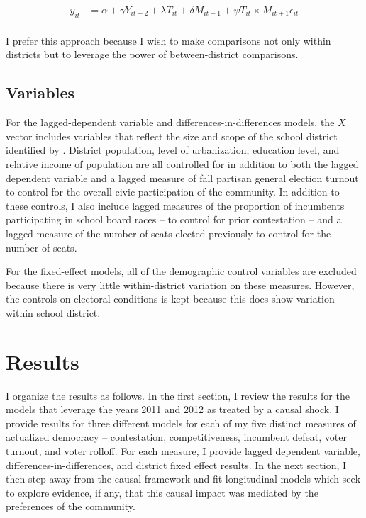 \begin{align*} 
y_{it} &= \alpha + \gamma Y_{it-2} + \lambda T_{it} + \delta M_{it+1} + \psi T_{it} \times M_{it+1} \epsilon_{it}  \\ 
\end{align*}

I prefer this approach because I wish to make comparisons not only within districts 
but to leverage the power of between-district comparisons. 

\subsection{Variables}

For the lagged-dependent variable and differences-in-differences models, the 
$X$ vector includes variables that reflect the size and scope of the school 
district identified by \citet{RefWorks:297}. District population, level of 
urbanization, 
education level, and relative income of population are all controlled for 
in addition to both the lagged dependent variable and a lagged measure of 
fall partisan general election turnout to control for the overall civic 
participation of the community. In addition to these controls, I also include 
lagged measures of the proportion of incumbents participating in school board 
races -- to control for prior contestation -- and a lagged measure of the number 
of seats elected previously to control for the number of seats. 

For the fixed-effect models, all of the demographic control variables are 
excluded because there is very little within-district variation on these measures. 
However, the controls on electoral conditions is kept because this does show 
variation within school district. 

\section{Results}

I organize the results as follows. In the first section, I review the results 
for the models that leverage the years 2011 and 2012 as treated by a causal 
shock. I provide results for three different models for each of my five distinct
measures of actualized democracy -- contestation, competitiveness, incumbent defeat,
voter turnout, and voter rolloff. For each measure, I provide lagged dependent 
variable, differences-in-differences, and district fixed effect results. 
In the next section, I then step away from the causal framework and 
fit longitudinal models which seek to explore evidence, if any, that this causal 
impact was mediated by the preferences of the community. 

